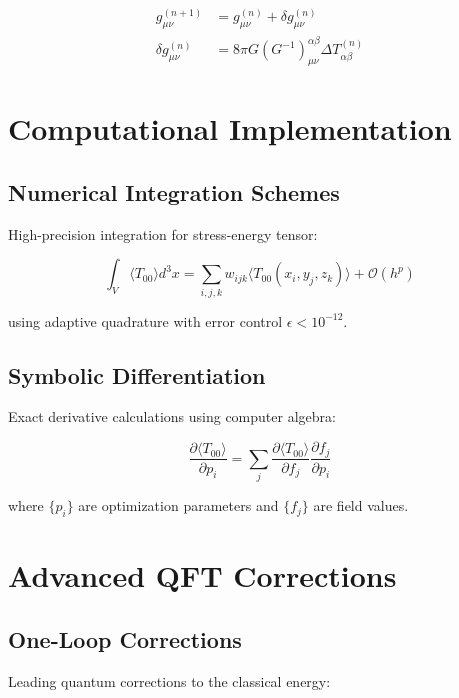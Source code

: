 \documentclass[12pt,a4paper]{article}
\begin{document}
\begin{align}
g_{\mu\nu}^{(n+1)} &= g_{\mu\nu}^{(n)} + \delta g_{\mu\nu}^{(n)} \\
\delta g_{\mu\nu}^{(n)} &= 8\pi G \left( G^{-1} \right)_{\mu\nu}^{\alpha\beta} \Delta T_{\alpha\beta}^{(n)}
\end{align}

\section{Computational Implementation}

\subsection{Numerical Integration Schemes}

High-precision integration for stress-energy tensor:

\begin{equation}
\int_V \langle T_{00} \rangle d^3x = \sum_{i,j,k} w_{ijk} \langle T_{00}(x_i, y_j, z_k) \rangle + \mathcal{O}(h^p)
\end{equation}

using adaptive quadrature with error control $\epsilon < 10^{-12}$.

\subsection{Symbolic Differentiation}

Exact derivative calculations using computer algebra:

\begin{equation}
\frac{\partial \langle T_{00} \rangle}{\partial p_i} = \sum_j \frac{\partial \langle T_{00} \rangle}{\partial f_j} \frac{\partial f_j}{\partial p_i}
\end{equation}

where $\{p_i\}$ are optimization parameters and $\{f_j\}$ are field values.

\section{Advanced QFT Corrections}

\subsection{One-Loop Corrections}

Leading quantum corrections to the classical energy:
\end{document}
